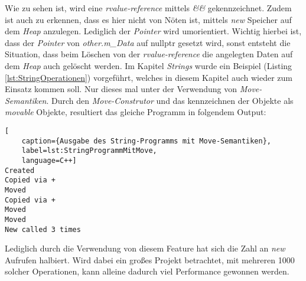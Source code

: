 Wie zu sehen ist, wird eine \emph{rvalue-reference} mittels \emph{\&\&} gekennzeichnet. Zudem ist
auch zu erkennen, dass es hier nicht von Nöten ist, mittels \emph{new} Speicher auf dem \emph{Heap}
anzulegen. Lediglich der \emph{Pointer} wird umorientiert. Wichtig hierbei ist, dass der
\emph{Pointer} von \emph{other.m\_Data} auf nullptr gesetzt wird, sonst entsteht die
Situation, dass beim Löschen von der \emph{rvalue-reference} die angelegten Daten auf dem
\emph{Heap} auch gelöscht werden.
\newline
\newline
Im Kapitel \emph{Strings} wurde ein Beispiel (Listing \ref{lst:StringOperationen}) vorgeführt,
welches in diesem Kapitel auch wieder zum Einsatz kommen soll. Nur dieses mal unter der
Verwendung von \emph{Move-Semantiken}. Durch den \emph{Move-Construtor} und das kennzeichnen
der Objekte als \emph{movable} Objekte, resultiert das gleiche Programm in folgendem Output:

\begin{lstlisting}[
    caption={Ausgabe des String-Programms mit Move-Semantiken},
    label=lst:StringProgrammMitMove,
    language=C++]
Created
Copied via +
Moved
Copied via +
Moved
Moved
New called 3 times
\end{lstlisting}

Lediglich durch die Verwendung von diesem Feature hat sich die Zahl an \emph{new} Aufrufen halbiert.
Wird dabei ein großes Projekt betrachtet, mit mehreren 1000 solcher Operationen, kann alleine
dadurch viel Performance gewonnen werden.